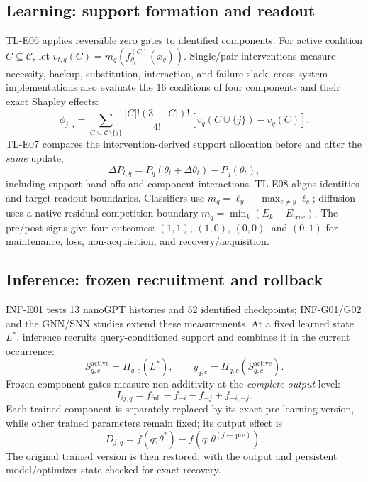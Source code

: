 \documentclass{article}
\begin{document}
\subsection{Learning: support formation and readout}
TL-E06 applies reversible zero gates to identified components. For active coalition $C\subseteq\mathcal C$, let $v_{t,q}(C)=m_q(f_{\theta_t}^{(C)}(x_q))$. Single/pair interventions measure necessity, backup, substitution, interaction, and failure slack; cross-system implementations also evaluate the 16 coalitions of four components and their exact Shapley effects:
\begin{equation}
 \phi_{j,q}=\!\!\sum_{C\subseteq\mathcal C\setminus\{j\}}
 \frac{|C|!(3-|C|)!}{4!}\left[v_q(C\cup\{j\})-v_q(C)\right].
 \label{eq:shapley}
\end{equation}
TL-E07 compares the intervention-derived support allocation before and after the \emph{same} update,
\begin{equation}
 \Delta P_{t,q}=P_q(\theta_t+\Delta\theta_t)-P_q(\theta_t),
 \label{eq:realloc}
\end{equation}
including support hand-offs and component interactions. TL-E08 aligns identities and target readout boundaries. Classifiers use $m_q=\ell_y-\max_{c\ne y}\ell_c$; diffusion uses a native residual-competition boundary $m_q=\min_k(E_k-E_{\mathrm{true}})$. The pre/post signs give four outcomes: $(1,1)$, $(1,0)$, $(0,0)$, and $(0,1)$ for maintenance, loss, non-acquisition, and recovery/acquisition.

\subsection{Inference: frozen recruitment and rollback}
INF-E01 tests 13 nanoGPT histories and 52 identified checkpoints; INF-G01/G02 and the GNN/SNN studies extend these measurements. At a fixed learned state $L^*$, inference recruits query-conditioned support and combines it in the current occurrence:
\begin{equation}
 S_{q,c}^{\mathrm{active}}=\Pi_{q,c}(L^*),\qquad
 y_{q,c}=H_{q,c}(S_{q,c}^{\mathrm{active}}).
 \label{eq:inference}
\end{equation}
Frozen component gates measure non-additivity at the \emph{complete output} level:
\begin{equation}
 I_{ij,q}=f_{\mathrm{full}}-f_{-i}-f_{-j}+f_{-i,-j}.
 \label{eq:interaction}
\end{equation}
Each trained component is separately replaced by its exact pre-learning version, while other trained parameters remain fixed; its output effect is
\begin{equation}
 D_{j,q}=f(q;\theta^*)-f(q;\theta^{(j\leftarrow\mathrm{pre})}).
 \label{eq:rollback}
\end{equation}
The original trained version is then restored, with the output and persistent model/optimizer state checked for exact recovery.
\end{document}
